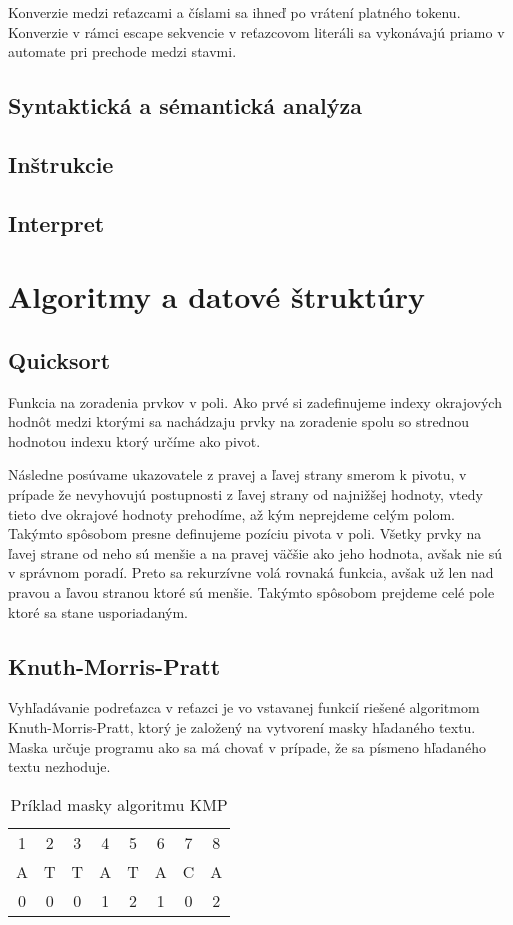 \documentclass[12pt,a4paper,titlepage,final]{article}
\begin{document}
Konverzie medzi reťazcami a číslami sa ihneď po vrátení platného tokenu.
Konverzie v rámci escape sekvencie v reťazcovom literáli sa vykonávajú
 priamo v automate pri prechode medzi stavmi.

\subsection{Syntaktická a sémantická analýza}

\subsection{Inštrukcie}

\subsection{Interpret}
\section{Algoritmy a datové štruktúry}
\subsection{Quicksort}
Funkcia na zoradenia prvkov v poli. Ako prvé si zadefinujeme indexy okrajových
hodnôt medzi ktorými sa nachádzaju prvky na zoradenie spolu so strednou hodnotou
indexu ktorý určíme ako pivot.

Následne posúvame ukazovatele  z pravej a ľavej strany smerom k pivotu,
 v prípade že nevyhovujú postupnosti z ľavej strany od najnižšej hodnoty, 
 vtedy tieto dve okrajové hodnoty prehodíme, až kým neprejdeme celým polom.
Takýmto spôsobom presne definujeme pozíciu pivota v poli. Všetky prvky na ľavej
 strane od neho sú menšie a na pravej väčšie ako jeho hodnota, avšak nie sú
 v správnom poradí. Preto sa rekurzívne volá rovnaká funkcia, avšak už len nad
 pravou a ľavou stranou ktoré sú menšie. Takýmto spôsobom prejdeme celé pole
 ktoré sa stane usporiadaným.

\subsection{Knuth-Morris-Pratt}
Vyhľadávanie podreťazca v reťazci je vo vstavanej funkcií riešené algoritmom
 Knuth-Morris-Pratt, ktorý je založený na vytvorení masky hľadaného textu.
Maska určuje programu ako sa má chovať v prípade, že sa písmeno hľadaného
 textu nezhoduje.
\begin{table}[H]
 \centering
 \begin{tabular}{cccccccc}
 	1 & 2 & 3 & 4 & 5 & 6 & 7 & 8 \\
 	A & T & T & A & T & A & C & A \\
 	0 & 0 & 0 & 1 & 2 & 1 & 0 & 2
 \end{tabular}
 \caption{Príklad masky algoritmu KMP}
 \label{tab:kmp}
\end{table}
\end{document}
